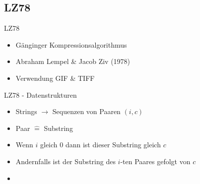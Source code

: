 \subsection{LZ78}

\begin{frame}{\FrameName}
	\begin{block}{LZ78}
		\begin{itemize}[<+->]
			\item Gänginger Kompressionsalgorithmus
			\item Abraham Lempel \& Jacob Ziv (1978)
			\item Verwendung GIF \& TIFF 
		\end{itemize}
	\end{block}
	\end{frame}

\begin{frame}{\FrameName}
\begin{block}{LZ78 - Datenstrukturen}
	\begin{itemize}[<+->]
		\item Strings $\rightarrow$ Sequenzen von Paaren $(i,c)$ \linebreak {}
		\item<3-> Paar $\hat{=}$ Substring
		\item<4-> Wenn $i$ gleich $0$ dann ist dieser Substring gleich $c$
		\item<4-> Andernfalls ist der Substring des $i$-ten Paares gefolgt von $c$
		\item<1->[] \Gap \begin{center}
		\end{center}
	\end{itemize}
\end{block}
\end{frame}

